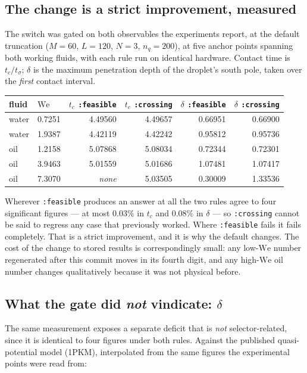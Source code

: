 \documentclass[11pt]{article}
\newcommand{\We}{\mathrm{We}}
\begin{document}
\subsection{The change is a strict improvement, measured}

The switch was gated on both observables the experiments report, at the default truncation
($M=60$, $L=120$, $N=3$, $n_q=200$), at five anchor points spanning both working fluids, with each
rule run on identical hardware. Contact time is $t_c/t_\sigma$; $\delta$ is the maximum penetration
depth of the droplet's south pole, taken over the \emph{first} contact interval.

\begin{center}
\begin{tabular}{llrrrr}
\hline
fluid & $\We$ & $t_c$ \texttt{:feasible} & $t_c$ \texttt{:crossing} & $\delta$ \texttt{:feasible} & $\delta$ \texttt{:crossing} \\
\hline
water & 0.7251 & 4.49560 & 4.49657 & 0.66951 & 0.66900 \\
water & 1.9387 & 4.42119 & 4.42242 & 0.95812 & 0.95736 \\
oil   & 1.2158 & 5.07868 & 5.08034 & 0.72344 & 0.72301 \\
oil   & 3.9463 & 5.01559 & 5.01686 & 1.07481 & 1.07417 \\
oil   & 7.3070 & \emph{none} & 5.03505 & 0.30009 & 1.33536 \\
\hline
\end{tabular}
\end{center}

Wherever \texttt{:feasible} produces an answer at all the two rules agree to four significant
figures --- at most $0.03\%$ in $t_c$ and $0.08\%$ in $\delta$ --- so \texttt{:crossing} cannot be
said to regress any case that previously worked. Where \texttt{:feasible} fails it fails completely.
That is a strict improvement, and it is why the default changes. The cost of the change to stored
results is correspondingly small: any low-$\We$ number regenerated after this commit moves in its
fourth digit, and any high-$\We$ oil number changes qualitatively because it was not physical
before.

\subsection{What the gate did \emph{not} vindicate: $\delta$}

The same measurement exposes a separate deficit that is \emph{not} selector-related, since it is
identical to four figures under both rules. Against the published quasi-potential model (1PKM),
interpolated from the same figures the experimental points were read from:
\end{document}
